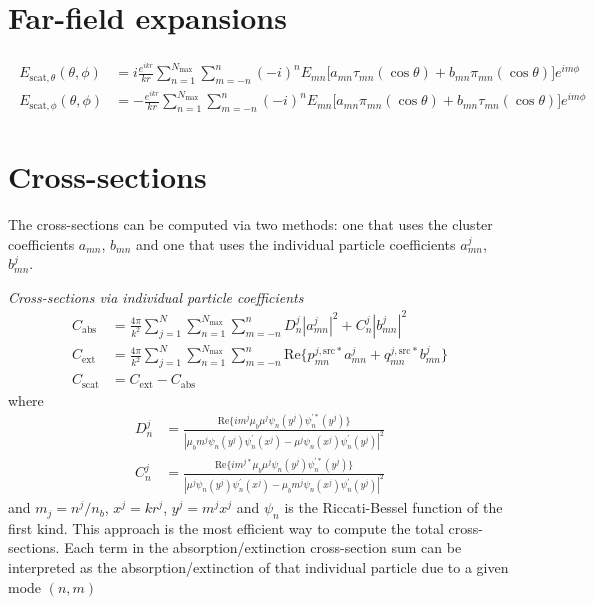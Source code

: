 \documentclass[11pt]{article}
\begin{document}
\section{Far-field expansions}

\begin{align}
\begin{split}
    E_{\text{scat},\theta}(\theta,\phi) &= i\frac{e^{ikr}}{kr} \sum_{n=1}^{N_\text{max}} \sum_{m=-n}^{n}
    (-i)^nE_{mn} \big[a_{mn}\tau_{mn}(\cos\theta) + b_{mn}\pi_{mn}(\cos\theta)\big] e^{im\phi} \\
    E_{\text{scat},\phi}(\theta,\phi) &= -\frac{e^{ikr}}{kr} \sum_{n=1}^{N_\text{max}} \sum_{m=-n}^{n}
    (-i)^nE_{mn} \big[a_{mn}\pi_{mn}(\cos\theta) + b_{mn}\tau_{mn}(\cos\theta)\big] e^{im\phi}
\end{split}
\end{align}

\section{Cross-sections}

The cross-sections can be computed via two methods: one that uses the cluster coefficients $a_{mn}$, $b_{mn}$ and one that uses the individual particle coefficients $a_{mn}^j$, $b_{mn}^j$.

\hfill

\textit{Cross-sections via individual particle coefficients} \cite{xu1997electromagnetic}
\begin{subequations}
\begin{align}
    C_\text{abs} &= \frac{4\pi}{k^2} \sum_{j=1}^N \sum_{n=1}^{N_\text{max}} \sum_{m=-n}^{n}
    D_n^j|a_{mn}^j|^2 + C_n^j|b_{mn}^j|^2 \\
    C_\text{ext} &= \frac{4\pi}{k^2} \sum_{j=1}^N \sum_{n=1}^{N_\text{max}} \sum_{m=-n}^{n}
    \text{Re} \bigg\{ p_{mn}^{j,\text{src}*} a_{mn}^j 
    + q_{mn}^{j,\text{src}*}b_{mn}^j \bigg\} \\
    C_\text{scat} &= C_\text{ext} - C_\text{abs}
\end{align}
\end{subequations}
where
\begin{subequations}
\begin{align}
    D_n^j &= \frac{\text{Re}\{ im^j \mu_b \mu^j \psi_n(y^j)\psi_n^{\prime *}(y^j)\}}
    {|\mu_b m^j \psi_n(y^j)\psi_n^\prime(x^j) - \mu^j \psi_n(x^j)\psi_n^\prime(y^j)|^2} \\
    C_n^j &= \frac{\text{Re}\{ im^{j*} \mu_b \mu^j \psi_n(y^j)\psi_n^{\prime *}(y^j)\}}
    {|\mu^j \psi_n(y^j)\psi_n^\prime(x^j) - \mu_b m^j \psi_n(x^j)\psi_n^\prime(y^j)|^2}
\end{align}
\end{subequations}
and $m_j = n^j/n_b$, $x^j = k r^j$, $y^j = m^jx^j$ and $\psi_n$ is the Riccati-Bessel function of the first kind.
This approach is the most efficient way to compute the total cross-sections.
Each term in the absorption/extinction cross-section sum can be interpreted as the absorption/extinction of that individual particle due to a given mode $(n,m)$
\end{document}
